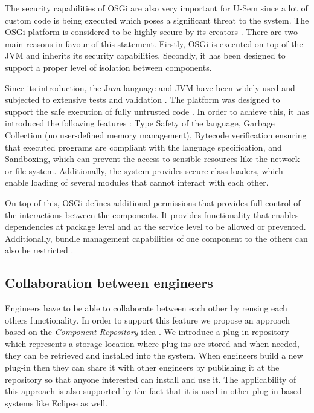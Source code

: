 The security capabilities of OSGi are also very important for U-Sem since a lot of custom code is being executed which poses a significant threat to the system. The OSGi platform is considered to be highly secure by its creators \cite{parrend2009security}. There are two main reasons in favour of this statement. Firstly, OSGi is executed on top of the JVM and inherits its security capabilities. Secondly, it has been designed to support a proper level of isolation between components.

Since its introduction, the Java language and JVM have been widely used and subjected to extensive tests and validation \cite{parrend2009security}. The platform was designed to support the safe execution of fully untrusted code \cite{dean1996java}. In order to achieve this, it has introduced the following features \cite{gong2003inside}: Type Safety of the language, Garbage Collection (no user-defined memory management), Bytecode verification ensuring that executed programs are compliant with the language specification, and Sandboxing, which can prevent the access to sensible resources like the network or file system. Additionally, the system provides secure class loaders, which enable loading of several modules that cannot interact with each other.

On top of this, OSGi defines additional permissions that provides full control of the interactions between the components. It provides functionality that enables dependencies at package level and at the service level to be allowed or prevented. Additionally, bundle management capabilities of one component to the others can also be restricted \cite{parrend2009security}.

\subsection{Collaboration between engineers}

Engineers have to be able to collaborate between each other by reusing each others functionality. In order to support this feature we propose an approach based on the \textit{Component Repository} idea \cite{seacord1999software}. We introduce a plug-in repository which represents a storage location where plug-ins are stored and when needed, they can be retrieved and installed into the system. When engineers build a new plug-in then they can share it with other engineers by publishing it at the repository so that anyone interested can install and use it. The applicability of this approach is also supported by the fact that it is used in other plug-in based systems like Eclipse \cite{mcaffer2010eclipse} as well.


